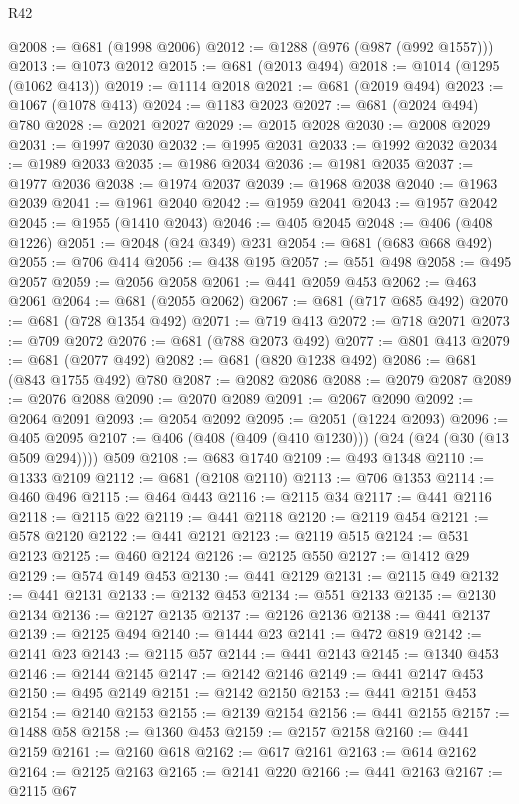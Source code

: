 \begin{lexlean}{R42}
\begin{coremodule}
@2008 := @681 (@1998 @2006)
@2012 := @1288 (@976 (@987 (@992 @1557)))
@2013 := @1073 @2012
@2015 := @681 (@2013 @494)
@2018 := @1014 (@1295 (@1062 @413))
@2019 := @1114 @2018
@2021 := @681 (@2019 @494)
@2023 := @1067 (@1078 @413)
@2024 := @1183 @2023
@2027 := @681 (@2024 @494) @780
@2028 := @2021 @2027
@2029 := @2015 @2028
@2030 := @2008 @2029
@2031 := @1997 @2030
@2032 := @1995 @2031
@2033 := @1992 @2032
@2034 := @1989 @2033
@2035 := @1986 @2034
@2036 := @1981 @2035
@2037 := @1977 @2036
@2038 := @1974 @2037
@2039 := @1968 @2038
@2040 := @1963 @2039
@2041 := @1961 @2040
@2042 := @1959 @2041
@2043 := @1957 @2042
@2045 := @1955 (@1410 @2043)
@2046 := @405 @2045
@2048 := @406 (@408 @1226)
@2051 := @2048 (@24 @349) @231
@2054 := @681 (@683 @668 @492)
@2055 := @706 @414
@2056 := @438 @195
@2057 := @551 @498
@2058 := @495 @2057
@2059 := @2056 @2058
@2061 := @441 @2059 @453
@2062 := @463 @2061
@2064 := @681 (@2055 @2062)
@2067 := @681 (@717 @685 @492)
@2070 := @681 (@728 @1354 @492)
@2071 := @719 @413
@2072 := @718 @2071
@2073 := @709 @2072
@2076 := @681 (@788 @2073 @492)
@2077 := @801 @413
@2079 := @681 (@2077 @492)
@2082 := @681 (@820 @1238 @492)
@2086 := @681 (@843 @1755 @492) @780
@2087 := @2082 @2086
@2088 := @2079 @2087
@2089 := @2076 @2088
@2090 := @2070 @2089
@2091 := @2067 @2090
@2092 := @2064 @2091
@2093 := @2054 @2092
@2095 := @2051 (@1224 @2093)
@2096 := @405 @2095
@2107 := @406 (@408 (@409 (@410 @1230))) (@24 (@24 (@30 (@13 @509 @294)))) @509
@2108 := @683 @1740
@2109 := @493 @1348
@2110 := @1333 @2109
@2112 := @681 (@2108 @2110)
@2113 := @706 @1353
@2114 := @460 @496
@2115 := @464 @443
@2116 := @2115 @34
@2117 := @441 @2116
@2118 := @2115 @22
@2119 := @441 @2118
@2120 := @2119 @454
@2121 := @578 @2120
@2122 := @441 @2121
@2123 := @2119 @515
@2124 := @531 @2123
@2125 := @460 @2124
@2126 := @2125 @550
@2127 := @1412 @29
@2129 := @574 @149 @453
@2130 := @441 @2129
@2131 := @2115 @49
@2132 := @441 @2131
@2133 := @2132 @453
@2134 := @551 @2133
@2135 := @2130 @2134
@2136 := @2127 @2135
@2137 := @2126 @2136
@2138 := @441 @2137
@2139 := @2125 @494
@2140 := @1444 @23
@2141 := @472 @819
@2142 := @2141 @23
@2143 := @2115 @57
@2144 := @441 @2143
@2145 := @1340 @453
@2146 := @2144 @2145
@2147 := @2142 @2146
@2149 := @441 @2147 @453
@2150 := @495 @2149
@2151 := @2142 @2150
@2153 := @441 @2151 @453
@2154 := @2140 @2153
@2155 := @2139 @2154
@2156 := @441 @2155
@2157 := @1488 @58
@2158 := @1360 @453
@2159 := @2157 @2158
@2160 := @441 @2159
@2161 := @2160 @618
@2162 := @617 @2161
@2163 := @614 @2162
@2164 := @2125 @2163
@2165 := @2141 @220
@2166 := @441 @2163
@2167 := @2115 @67

\end{coremodule}
\end{lexlean}
